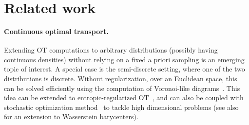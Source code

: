 

\section{Related work}

\paragraph{Continuous optimal transport.} Extending OT computations to arbitrary distributions
(possibly having continuous densities) without relying on a fixed a priori
sampling is an emerging topic of interest. A special case is the semi-discrete
setting, where one of the two distributions is discrete. Without regularization,
over an Euclidean space, this can be solved efficiently using the computation of
Voronoi-like diagrams~\cite{merigot2011multiscale}. This idea can be extended to
entropic-regularized OT~\cite{cuturi2018semidual}, and can also be coupled with
stochastic optimization method~\cite{2016-genevay-nips} to tackle high
dimensional problems (see also~\citet{staib2017parallel} for an extension to Wasserstein barycenters). 

